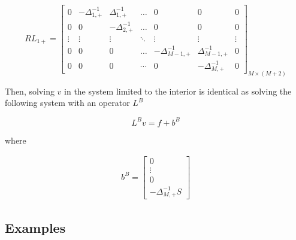 \documentclass[11pt]{article}
\theoremstyle{definition}
\begin{document}
\begin{equation}
R {L}_{1+} = \begin{bmatrix}
0&-\Delta_{1,+}^{-1}&\Delta_{1,+}^{-1}&\dots&0&0&0\\
0&0&-\Delta_{2,+}^{-1}&\dots&0&0&0\\
\vdots&\vdots&\vdots&\ddots&\vdots&\vdots&\vdots\\
0&0&0&\dots&-\Delta_{M-1,+}^{-1}&\Delta_{M-1,+}^{-1}&0\\
0&0&0&\cdots&0&-\Delta_{M,+}^{-1}&0
\end{bmatrix}_{M\times (M+2)} 
\end{equation}

Then, solving $v$ in the system limited to the interior is identical as solving the following system with an operator $L^B$ 

\begin{equation}
L^Bv= f + b^B
\end{equation}

where 

\begin{align}
b^B = \begin{bmatrix}
0 \\ \vdots \\ 0 \\
-\Delta_{M,+}^{-1} S
\end{bmatrix}
\end{align}




\subsection{Examples}
\end{document}
